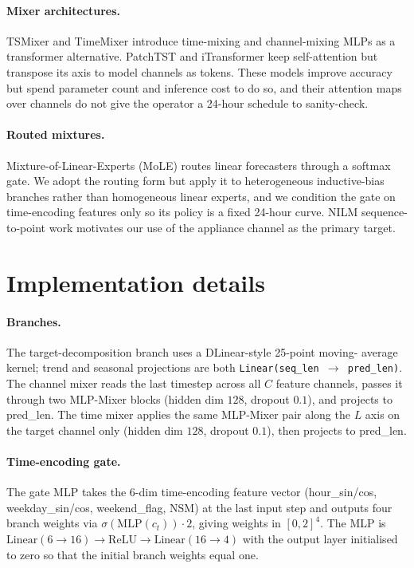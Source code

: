 \documentclass{article}
\begin{document}
\paragraph{Mixer architectures.}
TSMixer \citep{tsmixer} and TimeMixer \citep{timemixer} introduce
time-mixing and channel-mixing MLPs as a transformer alternative.
PatchTST \citep{patchtst} and iTransformer \citep{itransformer} keep
self-attention but transpose its axis to model channels as tokens.
These models improve accuracy but spend parameter count and inference
cost to do so, and their attention maps over channels do not give the
operator a 24-hour schedule to sanity-check.

\paragraph{Routed mixtures.}
Mixture-of-Linear-Experts (MoLE) \citep{mole} routes linear
forecasters through a softmax gate. We adopt the routing form but
apply it to heterogeneous inductive-bias branches rather than
homogeneous linear experts, and we condition the gate on
time-encoding features only so its policy is a fixed 24-hour curve. NILM
sequence-to-point work \citep{nilm} motivates our use of the
appliance channel as the primary target.


\section{Implementation details}
\label{si:impl}

\paragraph{Branches.}
The target-decomposition branch uses a DLinear-style 25-point moving-
average kernel; trend and seasonal projections are both
\texttt{Linear(seq\_len $\to$ pred\_len)}. The channel mixer reads the
last timestep across all $C$ feature channels, passes it through two
MLP-Mixer blocks (hidden dim $128$, dropout $0.1$), and projects to
pred\_len. The time mixer applies the same MLP-Mixer pair along the
$L$ axis on the target channel only (hidden dim $128$, dropout $0.1$),
then projects to pred\_len.

\paragraph{Time-encoding gate.}
The gate MLP takes the 6-dim time-encoding feature vector
(hour\_sin/cos, weekday\_sin/cos, weekend\_flag, NSM) at the
last input step and outputs four branch weights via
$\sigma(\mathrm{MLP}(c_t)) \cdot 2$, giving weights in
$[0, 2]^{4}$. The MLP is
$\mathrm{Linear}(6 \to 16) \to \mathrm{ReLU} \to \mathrm{Linear}(16 \to 4)$
with the output layer initialised to zero so that the initial
branch weights equal one.
\end{document}
